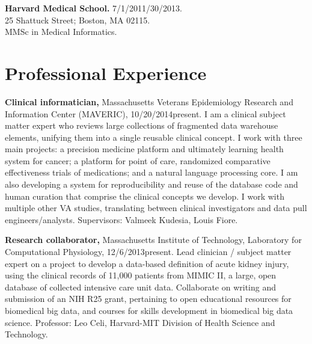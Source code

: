 \documentclass[12pt]{article}
\begin{document}
\textbf{Harvard Medical School.} 7/1/2011/30/2013.\\
25 Shattuck Street; Boston, MA 02115.\\
MMSc in Medical Informatics.

\section*{Professional Experience} %

\textbf{Clinical informatician,} Massachusetts Veterans Epidemiology
Research and Information Center (MAVERIC), 10/20/2014\ndash{}present.
I am a clinical subject matter expert who reviews large collections of
fragmented data warehouse elements, unifying them into a single
reusable clinical concept. I work with three main projects: a
precision medicine platform and ultimately learning health system for
cancer; a platform for point of care, randomized comparative
effectiveness trials of medications; and a natural language processing
core. I am also developing a system for reproducibility and reuse of
the database code and human curation that comprise the clinical
concepts we develop. I work with multiple other VA studies,
translating between clinical investigators and data pull
engineers/analysts. Supervisors: Valmeek Kudesia, Louis Fiore.

\textbf{Research collaborator,} Massachusetts Institute of Technology,
Laboratory for Computational Physiology, 12/6/2013\ndash{}present.
Lead clinician / subject matter expert on a project to develop a
data-based definition of acute kidney injury, using the clinical
records of 11,000 patients from MIMIC II, a large, open database of
collected intensive care unit data. Collaborate on writing and
submission of an NIH R25 grant, pertaining to open educational
resources for biomedical big data, and courses for skills development
in biomedical big data science. Professor: Leo Celi, Harvard-MIT
Division of Health Science and Technology.
\end{document}
